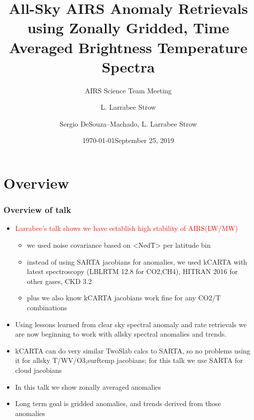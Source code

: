 \documentclass[10pt,t]{beamer}
\author{L. Larrabee Strow}
\date{\today}
\title{\large All-Sky AIRS Anomaly Retrievals \newline
  using Zonally Gridded, Time Averaged \newline
  Brightness Temperature Spectra}
\subtitle{\footnotesize{AIRS Science Team Meeting}}
\date{\vspace{0.1in}\footnotesize{September 25, 2019 \vfill}}
\author{Sergio DeSouza--Machado\inst{1,2}, L. Larrabee Strow\inst{1,2}}
\institute[UMBC]{\inst{1} UMBC Physics Dept. \and \inst{2}UMBC JCET}
\begin{document}
\maketitle
{}

\section{Overview}
\begin{frame}
  \frametitle{Overview of talk}
  \begin{itemize}
  \item \textcolor{red}{Larrabee's talk shows we have establish high stability of AIRS(LW/MW)}
  \begin{itemize}
    \item we used noise covariance based on <NedT> per latitude bin 
    \item instead of using SARTA jacobians for anomalies, we used kCARTA with latest spectroscopy
    (LBLRTM 12.8 for CO2,CH4), HITRAN 2016 for other gases, CKD 3.2
    \item plus we also know kCARTA jacobians work fine for any CO2/T combinations
  \end{itemize}
  \item Using lessons learned from clear sky spectral anomaly and rate retrievals 
     we are now beginning to work with  allsky spectral anomalies and trends.
  \item kCARTA can do very similar TwoSlab calcs to SARTA, so no problems using it for allsky
        T/WV/O3,surftemp jacobians; for this talk we use SARTA for cloud jacobians
  \item In this talk we show zonally averaged anomalies
  \item Long term goal is gridded anomalies, and trends derived from those anomalies
  \end{itemize}
\end{frame}

\end{document}
